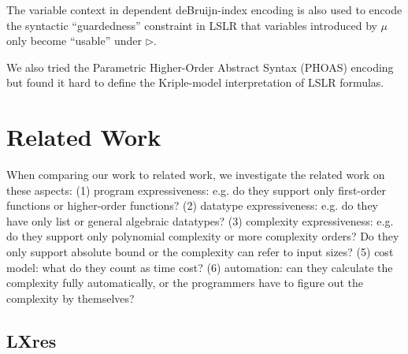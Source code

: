 \documentclass[preprint]{sigplanconf}
\newcommand{\later}{\triangleright}
\begin{document}
The variable context in dependent deBruijn-index encoding is also used to encode the syntactic ``guardedness'' constraint in LSLR that variables introduced by $\mu$ only become ``usable'' under $\later$.

We also tried the Parametric Higher-Order Abstract Syntax (PHOAS) encoding but found it hard to define the Kriple-model interpretation of LSLR formulas.

\section{\label{section-related}Related Work}

When comparing our work to related work, we investigate the related work on these aspects: (1) program expressiveness: e.g. do they support only first-order functions or higher-order functions? (2) datatype expressiveness: e.g. do they have only list or general algebraic datatypes? (3) complexity expressiveness: e.g. do they support only polynomial complexity or more complexity orders? Do they only support absolute bound or the complexity can refer to input sizes? (5) cost model: what do they count as time cost? (6) automation: can they calculate the complexity fully automatically, or the programmers have to figure out the complexity by themselves? 

\subsection{LXres}
\end{document}
